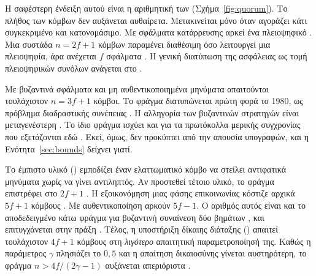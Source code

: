 Η σαφέστερη ένδειξη αυτού είναι η αριθμητική των 
(Σχήμα~\ref{fig:quorum}). Το πλήθος των κόμβων δεν αυξάνεται αυθαίρετα.
Μετακινείται μόνο όταν αγοράζει κάτι συγκεκριμένο και κατονομάσιμο. Με
σφάλματα κατάρρευσης αρκεί ένα πλειοψηφικό . Μια συστάδα
$n = 2f+1$ κόμβων παραμένει διαθέσιμη όσο λειτουργεί μια πλειοψηφία, άρα
ανέχεται $f$ σφάλματα \cite{ongaro2014raft}. Η γενική διατύπωση της
ασφάλειας ως τομή πλειοψηφικών συνόλων ανάγεται στο
\cite{lamport1998parttime}.

Με βυζαντινά σφάλματα και μη αυθεντικοποιημένα μηνύματα απαιτούνται
τουλάχιστον $n = 3f+1$ κόμβοι. Το φράγμα διατυπώνεται πρώτη φορά το 1980,
ως πρόβλημα διαδραστικής συνέπειας \cite{pease1980reaching}. Η αλληγορία
των βυζαντινών στρατηγών είναι μεταγενέστερη \cite{lamport1982byzantine}.
Το ίδιο φράγμα ισχύει και για τα πρωτόκολλα μερικής συγχρονίας που
εξετάζονται εδώ \cite{dwork1988consensus,amiri2024bedrock}. Εκεί, όμως,
δεν προκύπτει από την απουσία υπογραφών, και η
Ενότητα~\ref{sec:bounds} δείχνει γιατί.

Το έμπιστο υλικό () εμποδίζει έναν
ελαττωματικό κόμβο να στείλει αντιφατικά μηνύματα χωρίς να γίνει
αντιληπτός. Αν προστεθεί τέτοιο υλικό, το φράγμα επιστρέφει στο $2f+1$
\cite{amiri2024bedrock}. Η εξοικονόμηση μιας φάσης επικοινωνίας κόστιζε
αρχικά $5f+1$ κόμβους \cite{martin2006fab}\unver. Με αυθεντικοποίηση αρκούν
$5f-1$. Ο αριθμός αυτός είναι και το αποδεδειγμένο κάτω φράγμα για
βυζαντινή συναίνεση δύο βημάτων \cite{kuznetsov2021optimal}\unver, και
επιτυγχάνεται στην πράξη \cite{amiri2024bedrock}. Τέλος, η υποστήριξη
δίκαιης διάταξης () απαιτεί τουλάχιστον $4f+1$ κόμβους
στη \emph{λιγότερο} απαιτητική παραμετροποίησή της. Καθώς η παράμετρος
$\gamma$ πλησιάζει το $0{,}5$ και η απαίτηση δικαιοσύνης γίνεται
αυστηρότερη, το φράγμα $n > 4f/(2\gamma-1)$ αυξάνεται απεριόριστα
\cite{kelkar2020orderfairness,amiri2024bedrock}\unver.

